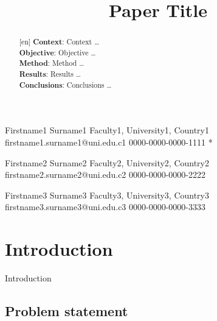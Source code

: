 \documentclass[]{einformatica}
\begin{document}

\title{Paper Title}




\EIauthorI
   {Firstname1}
   {Surname1}
   {Faculty1, University1, Country1}
   {firstname1.surname1@uni.edu.c1}
   {0000-0000-0000-1111} %
   {*} %

\EIauthorII
   {Firstname2}
   {Surname2}
   {Faculty2, University2, Country2}
   {firstname2.surname2@uni.edu.c2}
   {0000-0000-0000-2222}
   {} %
   
\EIauthorIII
   {Firstname3}
   {Surname3}
   {Faculty3, University3, Country3}
   {firstname3.surname3@uni.edu.c3}
   {0000-0000-0000-3333}
   {} %
 

\begin{abstract}[en] 
\textbf{Context}:
Context \dots \\ 
\textbf{Objective}: 
Objective \dots \\
\textbf{Method}: 
Method \dots \\
\textbf{Results}: 
Results \dots \\
\textbf{Conclusions}: 
Conclusions \dots
\end{abstract}

\maketitle 
 

\section{Introduction}\label{sec:Introduction}

Introduction
\cite{KitchenhamMadeyski17ESE} %


\subsection*{Problem statement} %
\end{document}

